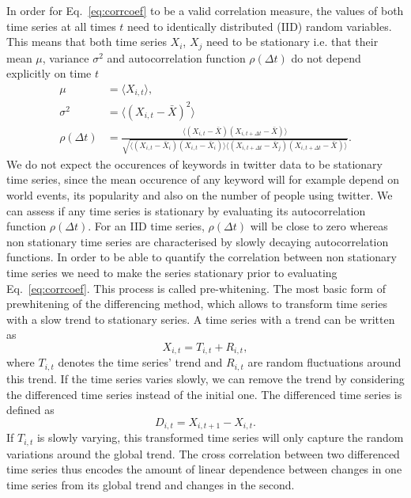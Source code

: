 \documentclass[12pt, a4paper]{article}
\begin{document}
In order for Eq.~\ref{eq:corrcoef} to be a valid correlation measure, the values of both time series at all times $t$ need to identically distributed (IID) random variables. This means that both time series $X_{i}$, $X_{j}$ need to be stationary i.e. that their mean $\mu$, variance $\sigma^{2}$ and autocorrelation function $\rho(\Delta t)$ do not depend explicitly on time $t$
\begin{align}
\mu &= \langle X_{i, t} \rangle, \\
\sigma^{2} &=  \langle (X_{i, t}-\bar{X})^{2} \rangle \\
\rho(\Delta t) &= \frac{\langle (X_{i, t}-\bar{X}) (X_{i, t+\Delta t}-\bar{X}) \rangle}{\sqrt{\langle (X_{i, t}-\bar{X}_{i}) (X_{i, t}-\bar{X}_{i}) \rangle \langle (X_{i, t+\Delta t}-\bar{X}_{j}) (X_{i, t+\Delta t}-\bar{X}_{}) \rangle}}. 
\end{align} 
We do not expect the occurences of keywords in twitter data to be stationary time series, since the mean occurence of any keyword will for example depend on world events, its popularity and also on the number of people using twitter. We can assess if any time series is stationary by evaluating its autocorrelation function $\rho(\Delta t)$. For an IID time series, $\rho(\Delta t)$ will be close to zero whereas non stationary time series are characterised by slowly decaying autocorrelation functions.
In order to be able to quantify the correlation between non stationary time series we need to make the series stationary prior to evaluating Eq.~\ref{eq:corrcoef}. This process is called pre-whitening. The most basic form of prewhitening of the differencing method, which allows to transform time series with a slow trend to stationary series. A time series with a trend can be written as
\begin{equation}
X_{i, t} = T_{i, t} + R_{i, t},
\end{equation} 
where $T_{i, t}$ denotes the time series' trend and $R_{i, t}$ are random fluctuations around this trend. If the time series varies slowly, we can remove the trend by considering the differenced time series instead of the initial one. The differenced time series is defined as
\begin{equation}
D_{i, t} = X_{i, t+1}- X_{i, t}.
\end{equation} 
If $T_{i, t}$ is slowly varying, this transformed time series will only capture the random variations around the global trend. The cross correlation between two differenced time series thus encodes the amount of linear dependence between changes in one time series from its global trend and changes in the second.
\end{document}
